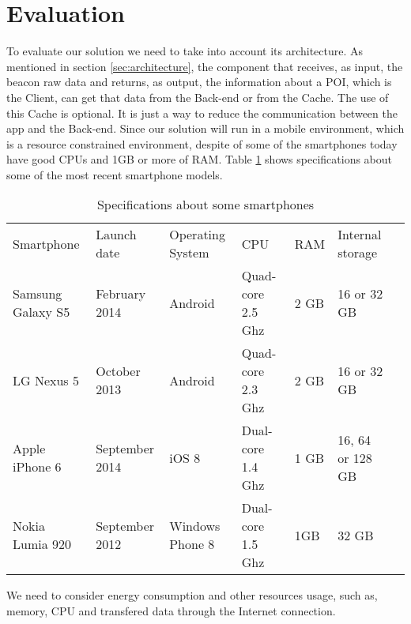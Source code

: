 
% 
% 

\section{Evaluation}
\label{sec:evaluation}


To evaluate our solution we need to take into account its
architecture. As mentioned in section \ref{sec:architecture},
the component that receives, as input, the beacon raw data and
returns, as output, the information about a POI, which is the
Client, can get that data from the Back-end or from the Cache.
The use of this Cache is optional. It is just a way to reduce
the communication between the app and the Back-end.
Since our solution will run in a mobile environment, 
which is a resource constrained environment,
despite of some of the smartphones today have
good CPUs and 1GB or more of RAM.
Table \ref{tab:smartphones} shows specifications about some 
of the most recent smartphone models.
\begin{table}[h]
\centering
\begin{tabular}{|l|l|l|l|l|l|l}
\cline{1-6}
Smartphone & Launch date & Operating System & CPU & RAM & Internal storage
\\
\cline{1-6}
Samsung Galaxy S5 & February 2014 & Android & Quad-core 2.5 Ghz & 2 GB & 16 or 32 GB
\\
\cline{1-6}
LG Nexus 5 & October 2013 & Android & Quad-core 2.3 Ghz & 2 GB & 16 or 32 GB
\\
\cline{1-6}
Apple iPhone 6 & September 2014 & iOS 8 & Dual-core 1.4 Ghz & 1 GB & 16, 64 or 128 GB
\\
\cline{1-6}
Nokia Lumia 920 & September 2012 & Windows Phone 8 & Dual-core 1.5 Ghz & 1GB & 32 GB
\\
\hline
\end{tabular}
\caption{Specifications about some smartphones}
\label{tab:smartphones}
\end{table}
We need to consider energy consumption and other resources
usage, such as, memory, CPU and transfered data through the
Internet connection.

